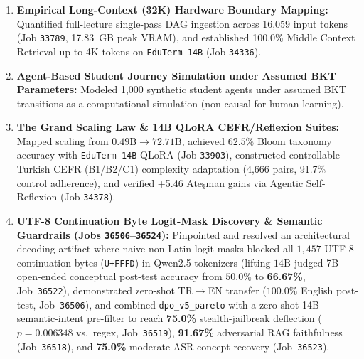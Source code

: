 \documentclass[a4paper,12pt]{report}
\begin{document}
\begin{enumerate}
    \item \textbf{Empirical Long-Context (32K) Hardware Boundary Mapping:} Quantified full-lecture single-pass DAG ingestion across 16,059 input tokens (Job \texttt{33789}, 17.83~GB peak VRAM), and established 100.0\% Middle Context Retrieval up to 4K tokens on \texttt{EduTerm-14B} (Job \texttt{34336}).
    \item \textbf{Agent-Based Student Journey Simulation under Assumed BKT Parameters:} Modeled 1,000 synthetic student agents under assumed BKT transitions as a computational simulation (non-causal for human learning).
    \item \textbf{The Grand Scaling Law \& 14B QLoRA CEFR/Reflexion Suites:} Mapped scaling from $0.49\text{B} \to 72.71\text{B}$, achieved $62.5\%$ Bloom taxonomy accuracy with \texttt{EduTerm-14B} QLoRA (Job \texttt{33903}), constructed controllable Turkish CEFR (B1/B2/C1) complexity adaptation (4,666 pairs, 91.7\% control adherence), and verified +5.46 Ate\c{s}man gains via Agentic Self-Reflexion (Job \texttt{34378}).
    \item \textbf{UTF-8 Continuation Byte Logit-Mask Discovery \& Semantic Guardrails (Jobs \texttt{36506}--\texttt{36524}):} Pinpointed and resolved an architectural decoding artifact where naive non-Latin logit masks blocked all $1{,}457$ UTF-8 continuation bytes (\texttt{U+FFFD}) in Qwen2.5 tokenizers (lifting $14\text{B}$-judged 7B open-ended conceptual post-test accuracy from $50.0\%$ to \textbf{66.67\%}, Job~\texttt{36522}), demonstrated zero-shot TR$\to$EN transfer ($100.0\%$ English post-test, Job~\texttt{36506}), and combined \texttt{dpo\_v5\_pareto} with a zero-shot 14B semantic-intent pre-filter to reach \textbf{75.0\%} stealth-jailbreak deflection ($p=0.006348$ vs.\ regex, Job~\texttt{36519}), \textbf{91.67\%} adversarial RAG faithfulness (Job~\texttt{36518}), and \textbf{75.0\%} moderate ASR concept recovery (Job~\texttt{36523}).
\end{enumerate}
\end{document}
